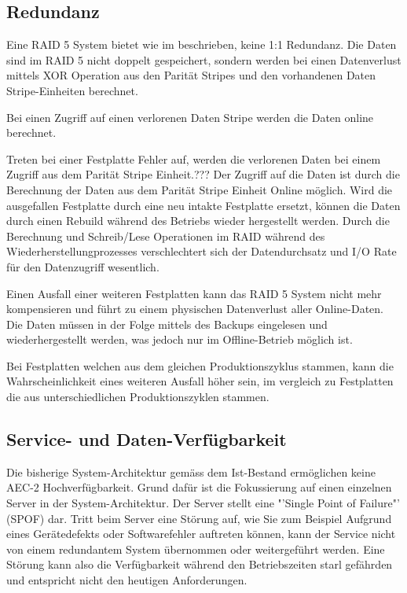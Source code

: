 \subsection{Redundanz}
Eine RAID 5 System bietet wie im  beschrieben, keine 1:1 Redundanz. Die Daten sind im RAID 5 nicht doppelt gespeichert, sondern werden bei einen Datenverlust mittels XOR Operation aus den Parität Stripes und den vorhandenen Daten Stripe-Einheiten berechnet. 

Bei einen Zugriff auf einen verlorenen Daten Stripe werden die Daten online berechnet. 

Treten bei einer Festplatte Fehler auf, werden die verlorenen Daten bei einem Zugriff aus dem Parität Stripe Einheit.??? Der Zugriff auf die Daten ist durch die Berechnung der Daten aus dem Parität Stripe Einheit Online möglich. Wird die ausgefallen Festplatte durch eine neu intakte Festplatte ersetzt, können die Daten durch einen Rebuild während des Betriebs wieder hergestellt werden. Durch die Berechnung und Schreib/Lese Operationen im RAID während des Wiederherstellungprozesses verschlechtert sich der Datendurchsatz und I/O Rate für den Datenzugriff wesentlich.

Einen Ausfall einer weiteren Festplatten kann das RAID 5 System nicht mehr kompensieren und führt zu einem physischen Datenverlust aller Online-Daten. Die Daten müssen in der Folge mittels des Backups eingelesen und wiederhergestellt werden, was jedoch nur im Offline-Betrieb möglich ist. 

Bei Festplatten welchen aus dem gleichen Produktionszyklus stammen, kann die Wahrscheinlichkeit eines weiteren Ausfall höher sein, im vergleich zu Festplatten die aus unterschiedlichen Produktionszyklen stammen.

\subsection{Service- und Daten-Verfügbarkeit}
Die bisherige System-Architektur gemäss dem Ist-Bestand ermöglichen keine AEC-2 Hochverfügbarkeit. Grund dafür ist die Fokussierung auf einen einzelnen Server in der System-Architektur. Der Server stellt eine "'Single Point of Failure"' (SPOF) dar. Tritt beim Server eine Störung auf, wie Sie zum Beispiel Aufgrund eines Gerätedefekts oder Softwarefehler auftreten können, kann der Service nicht von einem redundantem System übernommen oder weitergeführt werden. Eine Störung kann also die Verfügbarkeit während den Betriebszeiten starl gefährden und entspricht nicht den heutigen Anforderungen.

